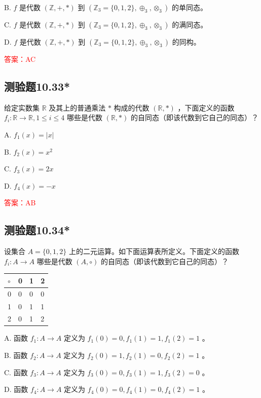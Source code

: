\documentclass[UTF8, heading=true]{ctexart}
\begin{document}
B. $f$ 是代数 $(\mathbb{Z},+, *)$ 到 $\left(\mathbb{Z}_3=\{0,1,2\}, \oplus_3, \otimes_3\right)$ 的单同态。

C. $f$ 是代数 $(\mathbb{Z},+, *)$ 到 $\left(\mathbb{Z}_3=\{0,1,2\}, \oplus_3, \otimes_3\right)$ 的满同态。

D. $f$ 是代数 $(\mathbb{Z},+, *)$ 到 $\left(\mathbb{Z}_3=\{0,1,2\}, \oplus_3, \otimes_3\right)$ 的同构。

\textcolor{red}{答案：AC}

\subsection{测验题10.33*}

给定实数集 $\mathbb{R}$ 及其上的普通乘法 $*$ 构成的代数 $(\mathbb{R}, *)$ ，下面定义的函数 $f_i: \mathbb{R} \rightarrow \mathbb{R}, 1 \leq i \leq 4$ 哪些是代数 $(\mathbb{R}, *)$ 的自同态（即该代数到它自己的同态）？

A. $ f_1(x)=|x|$

B. $f_2(x)=x^2$

C. $f_3(x)=2 x$

D. $f_4(x)=-x$

\textcolor{red}{答案：AB}

\subsection{测验题10.34*}

设集合 $A=\{0,1,2\}$ 上的二元运算。如下面运算表所定义。下面定义的函数 $f_i: A \rightarrow A$ 哪些是代数 $(A, \circ)$ 的自同态（即该代数到它自己的同态）？
\begin{table}[H]
  \renewcommand{\arraystretch}{1.5}
  \centering
\begin{tabular}{l|lll}
\hline$\circ$ & 0 & 1 & 2 \\
\hline 0 & 0 & 0 & 0 \\
1 & 0 & 1 & 1 \\
2 & 0 & 1 & 2 \\
\hline
\end{tabular}
\end{table}

A. 函数 $f_1: A \rightarrow A$ 定义为 $f_1(0)=0, f_1(1)=1, f_1(2)=1$ 。

B. 函数 $f_2: A \rightarrow A$ 定义为 $f_2(0)=1, f_2(1)=0, f_2(2)=1$ 。

C. 函数 $f_3: A \rightarrow A$ 定义为 $f_3(0)=0, f_3(1)=1, f_3(2)=0$ 。

D. 函数 $f_4: A \rightarrow A$ 定义为 $f_4(0)=0, f_4(1)=0, f_4(2)=1$ 。
\end{document}
